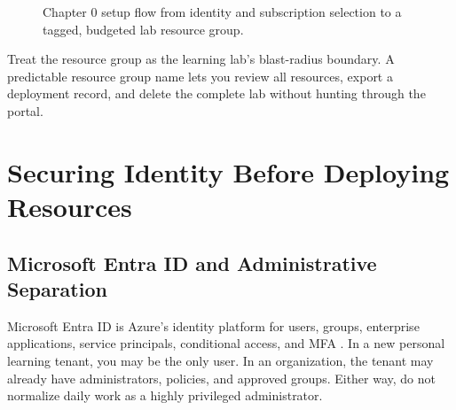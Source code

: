 \begin{figure}[H]
    \centering
    \caption{Chapter 0 setup flow from identity and subscription selection to a tagged, budgeted lab resource group.}
    \label{fig:chapter0-setup-flow}
\end{figure}

\begin{tipbox}
Treat the resource group as the learning lab's blast-radius boundary. A predictable resource group name lets you review all resources, export a deployment record, and delete the complete lab without hunting through the portal.
\end{tipbox}

\section{Securing Identity Before Deploying Resources}

\subsection{Microsoft Entra ID and Administrative Separation}
Microsoft Entra ID is Azure's identity platform for users, groups, enterprise applications, service principals, conditional access, and MFA \cite{microsoft2025entra}. In a new personal learning tenant, you may be the only user. In an organization, the tenant may already have administrators, policies, and approved groups. Either way, do not normalize daily work as a highly privileged administrator.

